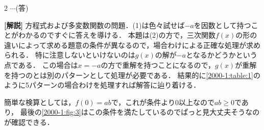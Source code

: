 \documentclass[../../main.tex]{subfiles}
\begin{document}
\begin{multicols}{2}
  $\cdots$(答)

  \vspace{10pt}
  {\bf[解説]}
  方程式および多変数関数の問題．(1)は色々試せば$-a$を因数として持つことがわかるのですぐに答えを導ける．
  本題は(2)の方で，三次関数$f(x)$の形の違いによって求める題意の条件が異なるので，場合わけによる正確な処理が求められる．
  特に注意しないといけないのは$g(x)$の解が$-a$となるかどうかという点である．
  この場合は$x=-a$の方で重解を持つことになるので，$g(x)$が重解を持つのとは別のパターンとして処理が必要である．
  結果的に\cref{2000-1:table:1}のように5パターンの場合わけを処理すれば解答に辿り着ける．

  簡単な検算としては，$f(0)=ab$で，これが条件より$0$以上なので$ab\ge 0$であり，
  最後の\cref{2000-1:fig:3}はこの条件を満たしているのでぱっと見大丈夫そうなのが確認できる．

  \newpage
\end{multicols}
\end{document}
